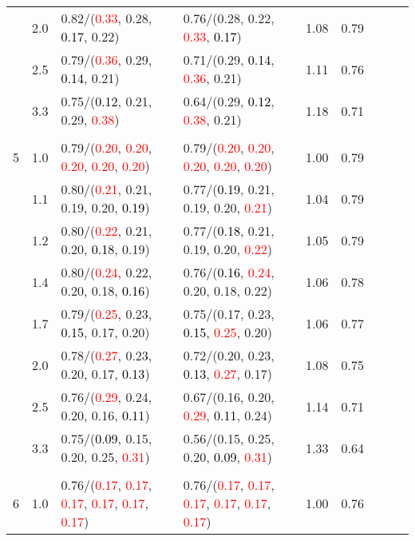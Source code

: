 \documentclass[10pt,a4paper]{report}
\begin{document}
\begin{table}[!htbp]
\begin{center}
{\begin{tabular}{ccllccccc}
			&2.0&0.82/(\textcolor{red}{0.33}, 0.28, \textcolor{black}{0.17}, 0.22)&0.76/(0.28, 0.22, \textcolor{red}{0.33}, \textcolor{black}{0.17})&1.08&0.79\\
			&2.5&0.79/(\textcolor{red}{0.36}, 0.29, \textcolor{black}{0.14}, 0.21)&0.71/(0.29, \textcolor{black}{0.14}, \textcolor{red}{0.36}, 0.21)&1.11&0.76\\
			&3.3&0.75/(\textcolor{black}{0.12}, 0.21, 0.29, \textcolor{red}{0.38})&0.64/(0.29, \textcolor{black}{0.12}, \textcolor{red}{0.38}, 0.21)&1.18&0.71\\
			&&&&\\
			5			&1.0&0.79/(\textcolor{red}{0.20}, \textcolor{red}{0.20}, \textcolor{red}{0.20}, \textcolor{red}{0.20}, \textcolor{red}{0.20})&0.79/(\textcolor{red}{0.20}, \textcolor{red}{0.20}, \textcolor{red}{0.20}, \textcolor{red}{0.20}, \textcolor{red}{0.20})&1.00&0.79\\
			&1.1&0.80/(\textcolor{red}{0.21}, 0.21, 0.19, 0.20, \textcolor{black}{0.19})&0.77/(\textcolor{black}{0.19}, 0.21, 0.19, 0.20, \textcolor{red}{0.21})&1.04&0.79\\
			&1.2&0.80/(\textcolor{red}{0.22}, 0.21, 0.20, \textcolor{black}{0.18}, 0.19)&0.77/(\textcolor{black}{0.18}, 0.21, 0.19, 0.20, \textcolor{red}{0.22})&1.05&0.79\\
			&1.4&0.80/(\textcolor{red}{0.24}, 0.22, 0.20, 0.18, \textcolor{black}{0.16})&0.76/(\textcolor{black}{0.16}, \textcolor{red}{0.24}, 0.20, 0.18, 0.22)&1.06&0.78\\
			&1.7&0.79/(\textcolor{red}{0.25}, 0.23, \textcolor{black}{0.15}, 0.17, 0.20)&0.75/(0.17, 0.23, \textcolor{black}{0.15}, \textcolor{red}{0.25}, 0.20)&1.06&0.77\\
			&2.0&0.78/(\textcolor{red}{0.27}, 0.23, 0.20, 0.17, \textcolor{black}{0.13})&0.72/(0.20, 0.23, \textcolor{black}{0.13}, \textcolor{red}{0.27}, 0.17)&1.08&0.75\\
			&2.5&0.76/(\textcolor{red}{0.29}, 0.24, 0.20, 0.16, \textcolor{black}{0.11})&0.67/(0.16, 0.20, \textcolor{red}{0.29}, \textcolor{black}{0.11}, 0.24)&1.14&0.71\\
			&3.3&0.75/(\textcolor{black}{0.09}, 0.15, 0.20, 0.25, \textcolor{red}{0.31})&0.56/(0.15, 0.25, 0.20, \textcolor{black}{0.09}, \textcolor{red}{0.31})&1.33&0.64\\
			&&&&\\
			6			&1.0&0.76/(\textcolor{red}{0.17}, \textcolor{red}{0.17}, \textcolor{red}{0.17}, \textcolor{red}{0.17}, \textcolor{red}{0.17}, \textcolor{red}{0.17})&0.76/(\textcolor{red}{0.17}, \textcolor{red}{0.17}, \textcolor{red}{0.17}, \textcolor{red}{0.17}, \textcolor{red}{0.17}, \textcolor{red}{0.17})&1.00&0.76\\

\end{tabular}}
\end{center}
\end{table}
\end{document}
